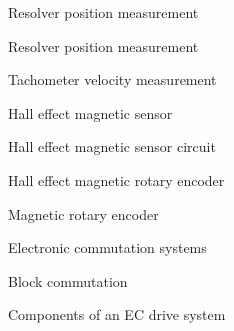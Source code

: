 \documentclass[compress]{beamer}
\begin{document}
{
    \begin{frame}{Resolver position measurement}
    \end{frame}
}

{
    \begin{frame}{Resolver position measurement}
    \end{frame}
}

{
    \begin{frame}{Tachometer velocity measurement}
    \end{frame}
}

{
    \begin{frame}{Hall effect magnetic sensor}
    \end{frame}
}

{
    \begin{frame}{Hall effect magnetic sensor circuit}
    \end{frame}
}

{
    \begin{frame}{Hall effect magnetic rotary encoder}
    \end{frame}
}

{
    \begin{frame}{Magnetic rotary encoder}
    \end{frame}
}

{
    \begin{frame}{Electronic commutation systems}
    \end{frame}
}

{
    \begin{frame}{Block commutation}
    \end{frame}
}

{
    \begin{frame}{Components of an EC drive system}
    \end{frame}
}
\end{document}
